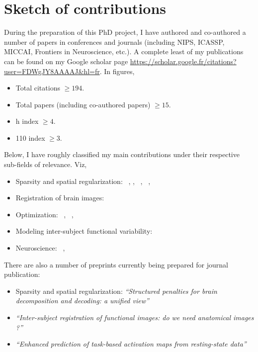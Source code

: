 \section{Sketch of contributions}
\label{sec:contrib}
During the preparation of this PhD project, I have authored and co-authored a number of papers in conferences and journals (including NIPS, ICASSP, MICCAI,
Frontiers in Neuroscience, etc.).
A complete least of my publications can be found on my Google scholar page \url{https://scholar.google.fr/citations?user=FDWgJY8AAAAJ&hl=fr}. In figures,
\begin{shaded}
\begin{itemize}
\item Total citations $\ge 194$.
  \item Total papers (including co-authored papers) $\ge 15$.
  \item h index $\ge 4$.
  \item 110 index $ \ge 3$.
  \end{itemize}
\end{shaded}  
Below, I  have roughly classified my main contributions under their respective sub-fields of relevance. Viz,
\begin{shaded}
\begin{itemize}
  \item{Sparsity and spatial regularization:}
     ~\citep{dohmatob2014benchmarking},  \citep{dohmatob2015speeding},
     ~\citep{abrahamregion},  ~\citep{eickenberg2015total},
     ~\citep{pelle2016multivariate}
  \item{Registration of brain images:}
    ~\citep{dohmatob2016epi2epi}
  \item{Optimization:}
     ~\citep{dohmatob2015local},  ~\citep{varoquaux2015faasta},  ~\citep{dohmatob2015simple}
  \item Modeling inter-subject functional variability:
     ~\citep{dohmatob2016}
  \item{Neuroscience:}
     ~\citep{rahim2015integrating},  ~\citep{thirion2014fmri}
\end{itemize}
\end{shaded}

There are also a number of preprints currently being prepared for journal publication:

\begin{shaded}
\begin{itemize}
  \item{Sparsity and spatial regularization:}
     \textit{``Structured penalties for brain decomposition and decoding: a unified view''}
   \item \textit{``Inter-subject registration of functional images: do we need anatomical images ?''}
   \item \textit{``Enhanced prediction of task-based activation maps
     from resting-state data''}
\end{itemize}
\end{shaded}



